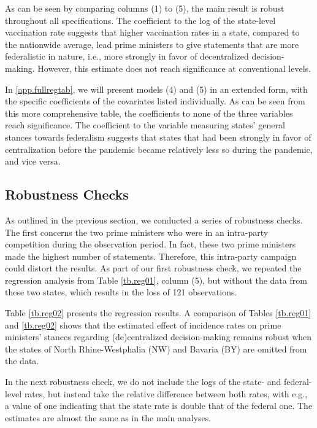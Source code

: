 \documentclass[authoryear,12pt, 3p]{elsarticle}
\theoremstyle{break}
\begin{document}
As can be seen by comparing columns (1) to (5), the main result is robust throughout all specifications. The coefficient to the log of the state-level vaccination rate suggests that higher vaccination rates in a state, compared to the nationwide average, lead prime ministers to give statements that are more federalistic in nature, i.e., more strongly in favor of decentralized decision-making. However, this estimate does not reach significance at conventional levels.

In \ref{app.fullregtab}, we will present models (4) and (5) in an extended form, with the specific coefficients of the covariates listed individually. As can be seen from this more comprehensive table, the coefficients to none of the three variables reach significance. The coefficient to the variable measuring states’ general stances towards federalism suggests that states that had been strongly in favor of centralization before the pandemic became relatively less so during the pandemic, and vice versa.

\subsection{Robustness Checks}
As outlined in the previous section, we conducted a series of robustness checks. The first concerns the two prime ministers who were in an intra-party competition during the observation period. In fact, these two prime ministers made the highest number of statements. Therefore, this intra-party campaign could distort the results. As part of our first robustness check, we repeated the regression analysis from  Table \ref{tb.reg01}, column (5), but without the data from these two states, which results in the loss of 121 observations.



Table \ref{tb.reg02} presents the regression results. A comparison of Tables \ref{tb.reg01} and \ref{tb.reg02} shows that the estimated effect of incidence rates on prime ministers’ stances regarding (de)centralized decision-making remains robust when the states of North Rhine-Westphalia (NW) and Bavaria (BY) are omitted from the data.

In the next robustness check, we do not include the logs of the state- and federal-level rates, but instead take the relative difference between both rates, with e.g., a value of one indicating that the state rate is double that of the federal one. The estimates are almost the same as in the main analyses.  
\end{document}
